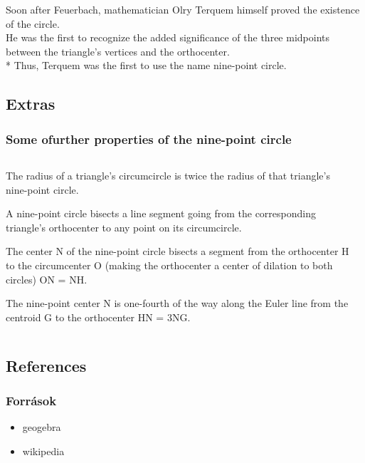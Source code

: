 \documentclass{beamer}
\begin{document}
\begin{frame}

Soon after Feuerbach, mathematician Olry Terquem himself proved the existence of the circle. \\
\medskip
He was the first to recognize the added significance of the three midpoints \\
 between the triangle's vertices and the orthocenter. \\*
\medskip
 Thus, Terquem was the first to use the name nine-point circle. 

\end{frame}

\subsection{Extras}

\begin{frame} 
        \frametitle {Some ofurther properties of the nine-point circle}
    
	

	 \begin{columns}
           	\begin{column}{9cm}

 
   			 {The radius of a triangle's circumcircle is twice the radius of that triangle's nine-point circle.} \par  
    \vspace{0.2cm}
     			 { A nine-point circle bisects a line segment going from the corresponding triangle's orthocenter to any point on its circumcircle.}
       
    \vspace{0.2cm}

    			 {The center N of the nine-point circle bisects a segment from the orthocenter H to the circumcenter O
				 (making the orthocenter a center of dilation to both circles)  ON = NH.} \par  

     			 {The nine-point center N is one-fourth of the way along the Euler line from the centroid G to the orthocenter
   					 HN = 3NG.}
	

           \end{column}

           \begin{column}{3.5cm}

   

           \end{column}
       
\end{columns}




\end{frame}

\subsection{References}

\begin{frame}
        \frametitle{Források}
    \begin{itemize}
        \item geogebra
	\item wikipedia

     \end{itemize}
\end{frame}
\end{document}

